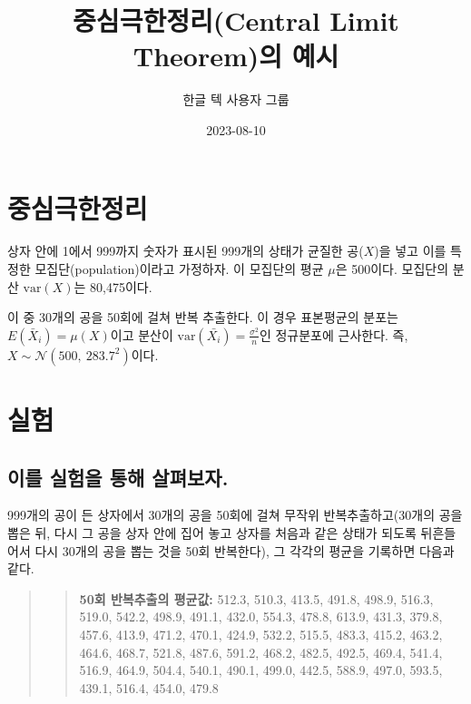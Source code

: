 \documentclass[
  chapter,a4paper,showtrims,openright,hidelinks]{oblivoir}
\title{중심극한정리(Central Limit Theorem)의 예시}
\author{한글 텍 사용자 그룹}
\date{2023-08-10}
\renewcommand*\contentsname{목 차}
\newcommand\contentsname{목 차}
\begin{document}
\maketitle
\renewcommand*\contentsname{목 차}
{
\hypersetup{linkcolor=}
\setcounter{tocdepth}{2}
\tableofcontents
}
\mainmatter
\pagestyle{demo}

\hypertarget{uxc911uxc2ecuxadf9uxd55cuxc815uxb9ac}{%
\chapter{중심극한정리}\label{uxc911uxc2ecuxadf9uxd55cuxc815uxb9ac}}

상자 안에 1에서 999까지 숫자가 표시된 999개의 상태가 균질한 공(\(X\))을
넣고 이를 특정한 모집단(population)이라고
가정하자. 이 모집단의 평균 \(\mu\)은
500이다. 모집단의 분산 \(\mathrm{var}(X)\)는
80,475이다.

이 중 30개의 공을 50회에 걸쳐 반복 추출한다. 이 경우
표본평균의 분포는 \(E(\bar{X}_i)=\mu(X)\)이고 분산이
\(\mathrm{var}(\bar{X_i})=\frac{\sigma^2}{n}\)인 정규분포에 근사한다.
즉, \(X \sim \mathcal{N}(500,~283.7^2)\)이다.

\hypertarget{uxc2e4uxd5d8}{%
\chapter{실험}\label{uxc2e4uxd5d8}}

\hypertarget{uxc774uxb97c-uxc2e4uxd5d8uxc744-uxd1b5uxd574-uxc0b4uxd3b4uxbcf4uxc790.}{%
\section{이를 실험을 통해
살펴보자.}\label{uxc774uxb97c-uxc2e4uxd5d8uxc744-uxd1b5uxd574-uxc0b4uxd3b4uxbcf4uxc790.}}

999개의 공이 든 상자에서 30개의 공을 50회에 걸쳐 무작위
반복추출하고(30개의 공을 뽑은 뒤, 다시 그 공을 상자 안에 집어 놓고
상자를 처음과 같은 상태가 되도록 뒤흔들어서 다시 30개의 공을 뽑는 것을
50회 반복한다), 그 각각의 평균을 기록하면 다음과
같다.

\begin{quote}
\begin{quote}
\textbf{50회 반복추출의 평균값:} 512.3, 510.3, 413.5, 491.8, 498.9,
516.3, 519.0, 542.2, 498.9, 491.1, 432.0, 554.3, 478.8, 613.9, 431.3,
379.8, 457.6, 413.9, 471.2, 470.1, 424.9, 532.2, 515.5, 483.3, 415.2,
463.2, 464.6, 468.7, 521.8, 487.6, 591.2, 468.2, 482.5, 492.5, 469.4,
541.4, 516.9, 464.9, 504.4, 540.1, 490.1, 499.0, 442.5, 588.9, 497.0,
593.5, 439.1, 516.4, 454.0, 479.8
\end{quote}
\end{quote}
\end{document}
